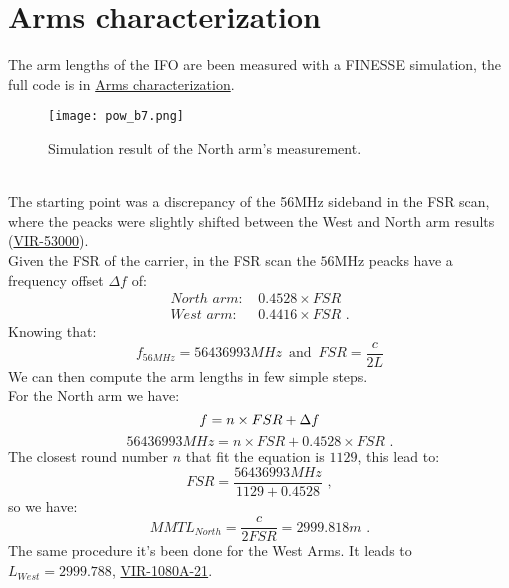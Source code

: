 \documentclass[color,DIV12,pdftex,a4paper]{virgo-note}
\begin{document}
\newpage
\section{Arms characterization}\label{sec:Arms characterization}
The arm lengths of the IFO are been measured with a FINESSE simulation, the full code is in \href{https://git.ligo.org/virgo/isc/finesse/andreas_freise/-/blob/master/2021/arm_length/arm_length.ipynb}{Arms characterization}.
\begin{figure}[h!]
  \centering
  \texttt{[image: pow\_b7.png]}
  \caption{Simulation result of the North arm's measurement.}
  \label{fig:n_arm}
\end{figure}
  \\ The starting point was a discrepancy of the 56MHz sideband in the FSR scan, where the peacks were slightly shifted between the West and North arm results (\href{https://logbook.virgo-gw.eu/virgo/?r=53000}{VIR-53000}).\\
Given the FSR of the carrier, in the FSR scan the $56$MHz peacks have a frequency offset $\Delta f$ of:\\
\begin{equation}\begin{aligned}
North\,\,arm:\, & 0.4528\times FSR\\
West\,\,arm:\, & 0.4416 \times FSR\,\,.
\end{aligned}
\end{equation}
Knowing that:
\begin{equation}
f_{56MHz}=56436993MHz\,\,\, \text{and}\,\,\, FSR=\frac{c}{2L}
\end{equation}
We can then compute the arm lengths in few simple steps.\\ For the North arm we have:
\vspace{0.5mm}
\begin{equation}
f = n\times FSR + \Delta f\\
\end{equation}
\begin{equation}
56436993 MHz= n\times FSR + 0.4528\times FSR\,\,.
\end{equation}
\vspace{0.5mm}
The closest round number $n$ that fit the equation is $1129$, this lead to:
\begin{equation}
  FSR=\frac{56436993MHz}{1129 + 0.4528}\,\,,
\end{equation}
so we have:
\begin{equation}MMT
  L_{North} = \frac{c}{2FSR}=2999.818m\,\,.
\end{equation}
\vspace{0.5mm}
The same procedure it's been done for the West Arms. It leads to $L_{West}=2999.788$, \href{https://tds.virgo-gw.eu/?content=3&r=19516}{VIR-1080A-21}.
\end{document}
